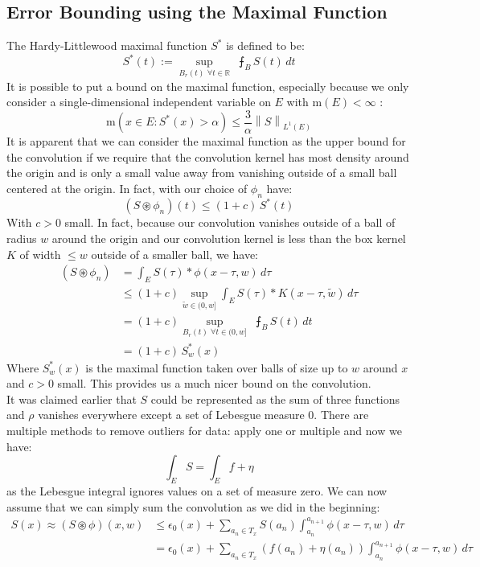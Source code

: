 \documentclass[11pt]{amsart}
\theoremstyle{definition}
\theoremstyle{remark}
\newcommand{\norm}[1]{\left\lVert#1\right\rVert}
\begin{document}
\subsection{Error Bounding using the Maximal Function}
The Hardy-Littlewood maximal function $S^*$ is defined to be:
\[
S^*(t) := \sup_{B_r(t)\,\, \forall t\in \mathbb{R}} \,\,\intbar_B S(t)\,dt 
\]
It is possible to put a bound on the maximal function, especially because we only consider a single-dimensional independent variable on $E$ with m$(E) < \infty$ \cite{stein_real_2006}:
\[
\text{m}({x\in E: S^*(x) > \alpha}) \le \frac{3}{\alpha} \norm{S}_{L^1(E)}
\]
It is apparent that we can consider the maximal function as the upper bound for the convolution if we require that the convolution kernel has most density around the origin and is only a small value away from vanishing outside of a small ball centered at the origin. In fact, with our choice of $\phi_n$ have:
\[
(S \circledast \phi_n)(t) \le (1+c) \,S^*(t)
\]
With $c>0$ small. In fact, because our convolution vanishes outside of a ball of radius $w$ around the origin and our convolution kernel is less than the box kernel $K$ of width $\le w$ outside of a smaller ball, we have:
\begin{align*}
(S\circledast \phi_n) &= \int_E S(\tau)*\phi(x-\tau, w)\,d\tau\\
& \le (1+c) \sup_{\tilde{w} \in (0,w]} \int_E S(\tau)*K(x-\tau, \tilde{w})\,d\tau\\
&=  (1+c) \sup_{B_r(t)\,\, \forall t\in (0, w]} \,\,\intbar_B S(t)\,dt\\
&= (1+c)\,S^*_{w}(x)
\end{align*}
Where $S^*_{w}(x)$ is the maximal function taken over balls of size up to $w$ around $x$ and $c>0$ small. This provides us a much nicer bound on the convolution.\\
It was claimed earlier that $S$ could be represented as the sum of three functions and $\rho$ vanishes everywhere except a set of Lebesgue measure 0. There are multiple methods to remove outliers for data: apply one or multiple and now we have:
\[
\int_E S = \int_E f + \eta
\]
as the Lebesgue integral ignores values on a set of measure zero. We can now assume that we can simply sum the convolution as we did in the beginning:
\begin{align*}
S(x)\approx(S\circledast\phi)(x, w) &\le \epsilon_0(x) + \sum_{a_n\in T_x} S\left(a_n\right)\int_{a_n}^{a_{n+1}} \phi(x-\tau, w)\,d\tau\\
&= \epsilon_0(x) + \sum_{a_n\in T_x} \left(f\left(a_n\right) + \eta\left(a_n\right)\right)\int_{a_n}^{a_{n+1}} \phi(x-\tau, w)\,d\tau\\
\end{align*}
\end{document}
